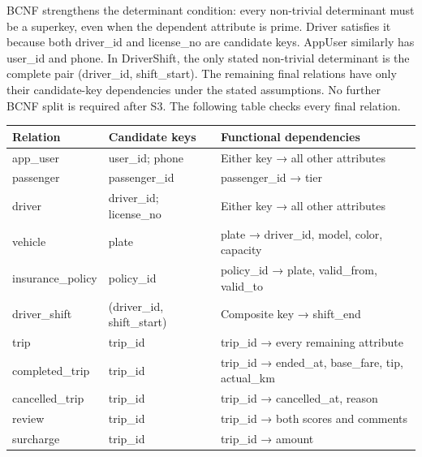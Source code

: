 \documentclass[11pt,a4paper]{article}
\begin{document}
BCNF strengthens the determinant condition: every non-trivial determinant must be a superkey, even when the dependent attribute is prime. Driver satisfies it because both driver\_\allowbreak{}id and license\_\allowbreak{}no are candidate keys. AppUser similarly has user\_\allowbreak{}id and phone. In DriverShift, the only stated non-trivial determinant is the complete pair (driver\_\allowbreak{}id, shift\_\allowbreak{}start). The remaining final relations have only their candidate-key dependencies under the stated assumptions. No further BCNF split is required after S3. The following table checks every final relation.

\par\begingroup\small\noindent
\begin{tabularx}{\linewidth}{p{3.0cm}p{4.0cm}X}
\toprule
Relation & Candidate keys & Functional dependencies\\\midrule
app\_\allowbreak{}user & user\_\allowbreak{}id; phone & Either key → all other attributes\\
passenger & passenger\_\allowbreak{}id & passenger\_\allowbreak{}id → tier\\
driver & driver\_\allowbreak{}id; license\_\allowbreak{}no & Either key → all other attributes\\
vehicle & plate & plate → driver\_\allowbreak{}id, model, color, capacity\\
insurance\_\allowbreak{}policy & policy\_\allowbreak{}id & policy\_\allowbreak{}id → plate, valid\_\allowbreak{}from, valid\_\allowbreak{}to\\
driver\_\allowbreak{}shift & (driver\_\allowbreak{}id, shift\_\allowbreak{}start) & Composite key → shift\_\allowbreak{}end\\
trip & trip\_\allowbreak{}id & trip\_\allowbreak{}id → every remaining attribute\\
completed\_\allowbreak{}trip & trip\_\allowbreak{}id & trip\_\allowbreak{}id → ended\_\allowbreak{}at, base\_\allowbreak{}fare, tip, actual\_\allowbreak{}km\\
cancelled\_\allowbreak{}trip & trip\_\allowbreak{}id & trip\_\allowbreak{}id → cancelled\_\allowbreak{}at, reason\\
review & trip\_\allowbreak{}id & trip\_\allowbreak{}id → both scores and comments\\
surcharge & trip\_\allowbreak{}id & trip\_\allowbreak{}id → amount\\
\bottomrule
\end{tabularx}
\par\endgroup
\end{document}
